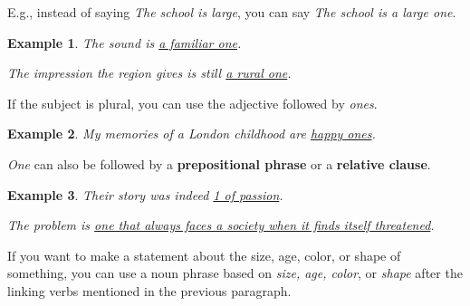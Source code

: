 \documentclass[oneside]{book}
\numberwithin{equation}{section}
\newtheorem{example}{Example}[section]
\begin{document}
E.g., instead of saying \textit{The school is large}, you can say \textit{The school is a large one}.
\begin{example}
    The sound is \underline{a familiar one}.
    
    The impression the region gives is still \underline{a rural one}.
\end{example}
If the subject is plural, you can use the adjective followed by \textit{ones}.
\begin{example}
    My memories of a London childhood are \underline{happy ones}.
\end{example}
\textit{One} can also be followed by a \textbf{prepositional phrase} or a \textbf{relative clause}.
\begin{example}
    Their story was indeed \underline{1 of passion}.
    
    The problem is \underline{one that always faces a society when it finds itself threatened}.
\end{example}
%
\noindent{} If you want to make a statement about the size, age, color, or shape of something, you can use a noun phrase based on \textit{size, age, color}, or \textit{shape} after the linking verbs mentioned in the previous paragraph.
\end{document}
